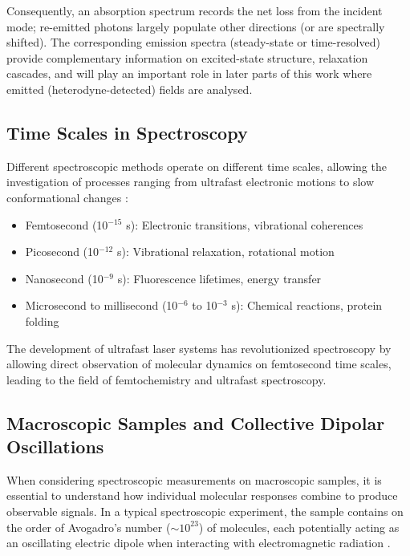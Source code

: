 \noindent Consequently, an absorption spectrum records the net loss from the incident mode; re-emitted photons largely populate other directions (or are spectrally shifted). The corresponding emission spectra (steady-state or time-resolved) provide complementary information on excited-state structure, relaxation cascades, and will play an important role in later parts of this work where emitted (heterodyne-detected) fields are analysed.


\subsection{Time Scales in Spectroscopy}
\label{subsec:time_scales}

\noindent Different spectroscopic methods operate on different time scales, allowing the investigation of processes ranging from ultrafast electronic motions to slow conformational changes \cite{bogaczetal2025xrayabsorptionspectroscopy, fullerogilvie2015experimentalimplementationstwodimensional}:

\begin{itemize}
	\item Femtosecond (10$^{-15}$ s): Electronic transitions, vibrational coherences
	\item Picosecond (10$^{-12}$ s): Vibrational relaxation, rotational motion
	\item Nanosecond (10$^{-9}$ s): Fluorescence lifetimes, energy transfer
	\item Microsecond to millisecond (10$^{-6}$ to 10$^{-3}$ s): Chemical reactions, protein folding
\end{itemize}

\noindent The development of ultrafast laser systems has revolutionized spectroscopy by allowing direct observation of molecular dynamics on femtosecond time scales, leading to the field of femtochemistry and ultrafast spectroscopy.

\subsection{Macroscopic Samples and Collective Dipolar Oscillations}
\label{subsec:macroscopic_samples}

\noindent When considering spectroscopic measurements on macroscopic samples, it is essential to understand how individual molecular responses combine to produce observable signals. In a typical spectroscopic experiment, the sample contains on the order of Avogadro's number ($\sim 10^{23}$) of molecules, each potentially acting as an oscillating electric dipole when interacting with electromagnetic radiation \cite{feynman1965feynmanlecturesphysics}.


